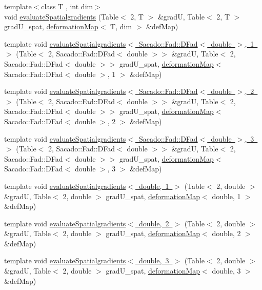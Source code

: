 \begin{DoxyCompactItemize}
\item 
{\footnotesize template$<$class T , int dim$>$ }\\void \mbox{\hyperlink{group___evaluation_functions_gadb862d9530a60b8ce5255222778ceeb6}{evaluate\+Spatialgradients}} (Table$<$ 2, T $>$ \&gradU, Table$<$ 2, T $>$ grad\+U\+\_\+spat, \mbox{\hyperlink{structdeformation_map}{deformation\+Map}}$<$ T, dim $>$ \&def\+Map)
\item 
template void \mbox{\hyperlink{function_evaluations_8cc_a63fd1422475c69c324aefec06a9b4fa0}{evaluate\+Spatialgradients$<$ Sacado\+::\+Fad\+::\+D\+Fad$<$ double $>$, 1 $>$}} (Table$<$ 2, Sacado\+::\+Fad\+::\+D\+Fad$<$ double $>$$>$ \&gradU, Table$<$ 2, Sacado\+::\+Fad\+::\+D\+Fad$<$ double $>$$>$ grad\+U\+\_\+spat, \mbox{\hyperlink{structdeformation_map}{deformation\+Map}}$<$ Sacado\+::\+Fad\+::\+D\+Fad$<$ double $>$, 1 $>$ \&def\+Map)
\item 
template void \mbox{\hyperlink{function_evaluations_8cc_a574a864ff662620c8b632523d5a2fe61}{evaluate\+Spatialgradients$<$ Sacado\+::\+Fad\+::\+D\+Fad$<$ double $>$, 2 $>$}} (Table$<$ 2, Sacado\+::\+Fad\+::\+D\+Fad$<$ double $>$$>$ \&gradU, Table$<$ 2, Sacado\+::\+Fad\+::\+D\+Fad$<$ double $>$$>$ grad\+U\+\_\+spat, \mbox{\hyperlink{structdeformation_map}{deformation\+Map}}$<$ Sacado\+::\+Fad\+::\+D\+Fad$<$ double $>$, 2 $>$ \&def\+Map)
\item 
template void \mbox{\hyperlink{function_evaluations_8cc_adc3a2ad656bc48d7a11c24f546ba43bd}{evaluate\+Spatialgradients$<$ Sacado\+::\+Fad\+::\+D\+Fad$<$ double $>$, 3 $>$}} (Table$<$ 2, Sacado\+::\+Fad\+::\+D\+Fad$<$ double $>$$>$ \&gradU, Table$<$ 2, Sacado\+::\+Fad\+::\+D\+Fad$<$ double $>$$>$ grad\+U\+\_\+spat, \mbox{\hyperlink{structdeformation_map}{deformation\+Map}}$<$ Sacado\+::\+Fad\+::\+D\+Fad$<$ double $>$, 3 $>$ \&def\+Map)
\item 
template void \mbox{\hyperlink{function_evaluations_8cc_a629c7bb265581b5853dbfb9af43c4a0a}{evaluate\+Spatialgradients$<$ double, 1 $>$}} (Table$<$ 2, double $>$ \&gradU, Table$<$ 2, double $>$ grad\+U\+\_\+spat, \mbox{\hyperlink{structdeformation_map}{deformation\+Map}}$<$ double, 1 $>$ \&def\+Map)
\item 
template void \mbox{\hyperlink{function_evaluations_8cc_a8f2e81f6aec814594a6ce54d2a8634f4}{evaluate\+Spatialgradients$<$ double, 2 $>$}} (Table$<$ 2, double $>$ \&gradU, Table$<$ 2, double $>$ grad\+U\+\_\+spat, \mbox{\hyperlink{structdeformation_map}{deformation\+Map}}$<$ double, 2 $>$ \&def\+Map)
\item 
template void \mbox{\hyperlink{function_evaluations_8cc_ac4df16de901d5280657a240a274e62a2}{evaluate\+Spatialgradients$<$ double, 3 $>$}} (Table$<$ 2, double $>$ \&gradU, Table$<$ 2, double $>$ grad\+U\+\_\+spat, \mbox{\hyperlink{structdeformation_map}{deformation\+Map}}$<$ double, 3 $>$ \&def\+Map)

\end{DoxyCompactItemize}
